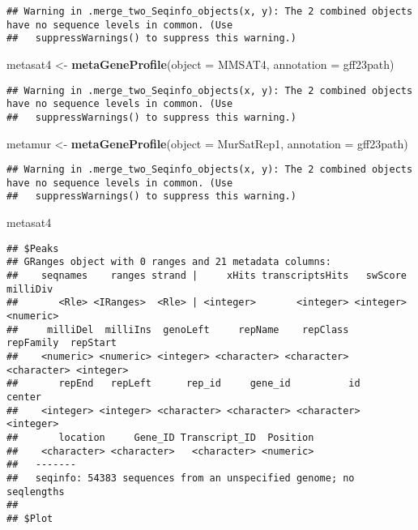 \documentclass[
]{article}
\newenvironment{Shaded}{\begin{snugshade}}{\end{snugshade}}
\newcommand{\AttributeTok}[1]{\textcolor[rgb]{0.13,0.29,0.53}{#1}}
\newcommand{\FunctionTok}[1]{\textcolor[rgb]{0.13,0.29,0.53}{\textbf{#1}}}
\newcommand{\NormalTok}[1]{#1}
\newcommand{\OtherTok}[1]{\textcolor[rgb]{0.56,0.35,0.01}{#1}}
\begin{document}
\begin{verbatim}
## Warning in .merge_two_Seqinfo_objects(x, y): The 2 combined objects have no sequence levels in common. (Use
##   suppressWarnings() to suppress this warning.)
\end{verbatim}

\begin{Shaded}
\begin{Highlighting}[]
\NormalTok{metasat4 }\OtherTok{\textless{}{-}} \FunctionTok{metaGeneProfile}\NormalTok{(}\AttributeTok{object =}\NormalTok{ MMSAT4, }\AttributeTok{annotation =}\NormalTok{ gff23path)}
\end{Highlighting}
\end{Shaded}

\begin{verbatim}
## Warning in .merge_two_Seqinfo_objects(x, y): The 2 combined objects have no sequence levels in common. (Use
##   suppressWarnings() to suppress this warning.)
\end{verbatim}

\begin{Shaded}
\begin{Highlighting}[]
\NormalTok{metamur }\OtherTok{\textless{}{-}} \FunctionTok{metaGeneProfile}\NormalTok{(}\AttributeTok{object =}\NormalTok{ MurSatRep1, }\AttributeTok{annotation =}\NormalTok{ gff23path)}
\end{Highlighting}
\end{Shaded}

\begin{verbatim}
## Warning in .merge_two_Seqinfo_objects(x, y): The 2 combined objects have no sequence levels in common. (Use
##   suppressWarnings() to suppress this warning.)
\end{verbatim}

\begin{Shaded}
\begin{Highlighting}[]
\NormalTok{metasat4}
\end{Highlighting}
\end{Shaded}

\begin{verbatim}
## $Peaks
## GRanges object with 0 ranges and 21 metadata columns:
##    seqnames    ranges strand |     xHits transcriptsHits   swScore  milliDiv
##       <Rle> <IRanges>  <Rle> | <integer>       <integer> <integer> <numeric>
##     milliDel  milliIns  genoLeft     repName    repClass   repFamily  repStart
##    <numeric> <numeric> <integer> <character> <character> <character> <integer>
##       repEnd   repLeft      rep_id     gene_id          id    center
##    <integer> <integer> <character> <character> <character> <integer>
##       location     Gene_ID Transcript_ID  Position
##    <character> <character>   <character> <numeric>
##   -------
##   seqinfo: 54383 sequences from an unspecified genome; no seqlengths
## 
## $Plot
\end{verbatim}
\end{document}

